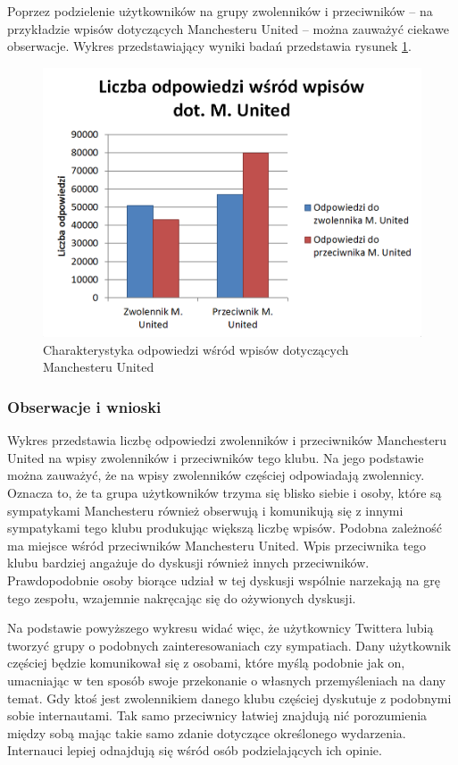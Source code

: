 Poprzez podzielenie użytkowników na grupy zwolenników i przeciwników -- na
przykładzie wpisów dotyczących Manchesteru United -- można zauważyć ciekawe
obserwacje. Wykres przedstawiający wyniki badań przedstawia rysunek 
\ref{image:replies-munited}.

\begin{figure}[ht!]
\centering
\includegraphics[width=120mm]{img/replies-munited.png}
\caption{Charakterystyka odpowiedzi wśród wpisów dotyczących Manchesteru United}
\label{image:replies-munited}
\end{figure}

\subsubsection{Obserwacje i wnioski}
Wykres przedstawia liczbę odpowiedzi zwolenników i przeciwników Manchesteru 
United na wpisy zwolenników i przeciwników tego klubu. Na jego podstawie można
zauważyć, że na wpisy zwolenników częściej odpowiadają zwolennicy. 
Oznacza to, że ta grupa użytkowników trzyma się blisko siebie i osoby, które
są sympatykami Manchesteru również obserwują i komunikują się z innymi 
sympatykami tego klubu produkując większą liczbę wpisów.
Podobna zależność ma miejsce wśród przeciwników Manchesteru United.
Wpis przeciwnika tego klubu bardziej angażuje do dyskusji również innych
przeciwników. Prawdopodobnie osoby biorące udział w tej dyskusji wspólnie
narzekają na grę tego zespołu, wzajemnie nakręcając się do ożywionych dyskusji.

Na podstawie powyższego wykresu widać więc, że użytkownicy Twittera lubią 
tworzyć grupy o podobnych zainteresowaniach czy sympatiach. Dany użytkownik
częściej będzie komunikował się z osobami, które myślą podobnie jak on,
umacniając w ten sposób swoje przekonanie o własnych przemyśleniach na dany temat.
Gdy ktoś jest zwolennikiem danego klubu częściej dyskutuje z podobnymi sobie
internautami. Tak samo przeciwnicy łatwiej znajdują nić porozumienia między sobą
mając takie samo zdanie dotyczące określonego wydarzenia. Internauci lepiej
odnajdują się wśród osób podzielających ich opinie.  









